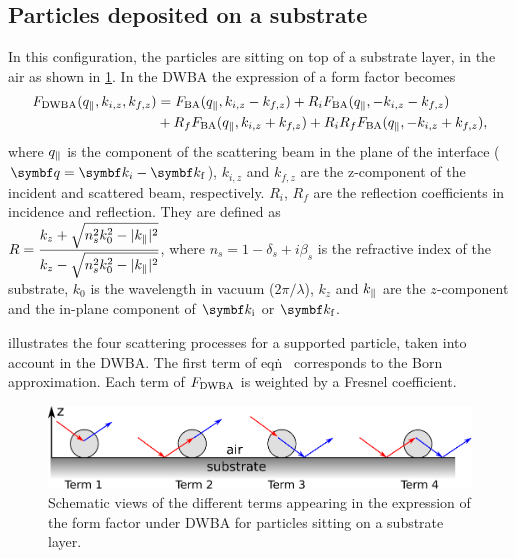 \subsection{Particles deposited on a substrate}
In this configuration, the particles are sitting on top of a substrate layer, in the air as shown in \cref{fig:SchemDWBA}. In the DWBA the expression of a form factor becomes
\begin{align}
F_{\rm{DWBA}}(q_{\parallel}, k_{i,z}, k_{f,z}) &= F_{\rm{BA}}(q_{\parallel}, k_{i,z}-k_{f,z})+ R_i F_{\rm{BA}}(q_{\parallel}, -k_{i,z}-k_{f,z}) \nonumber \\
&+ R_f F_{\rm{BA}}(q_{\parallel}, k_{i,z}+k_{f,z}) + R_i R_f F_{\rm{BA}}(q_{\parallel},-k_{i,z}+k_{f,z}), \label{Edwbaair}
\end{align}
where $q_{\parallel}$ is the component of the scattering beam in the plane of the interface ($\q=\k_i-\k_\sf$), $k_{i,z}$ and $k_{f,z}$ are the z-component of the incident and scattered beam, respectively. $R_i$, $R_f$ are the reflection coefficients in incidence and reflection. They are defined as\\ $R=\dfrac{k_z+\sqrt{n_s^2k_0^2-|k_{\parallel}|^2}}{k_z-\sqrt{n_s^2 k_0^2-|k_{\parallel}|^2}}$, where $n_s=1-\delta_s +i \beta_s$ is the refractive index of the substrate, $k_0$ is the wavelength in vacuum ($2\pi /\lambda$), $k_z$ and $k_{\parallel}$ are the $z$-component and the in-plane component of $\k_\si$ or $\k_\sf$. \\


\vspace{18pt}

 illustrates the four scattering processes for a supported particle, taken into account in the DWBA. The first term of eqn\.~  corresponds to the Born approximation. Each term of $F_{\rm{DWBA}}$ is weighted by a Fresnel coefficient.

\begin{figure}[tb]
\begin{center}
\includegraphics[width=\textwidth]{fig/drawing/drawingDWBA.pdf}
\end{center}
\caption{Schematic views of the different terms appearing in the expression of the form factor under DWBA for particles sitting on a substrate layer.}
\label{fig:SchemDWBA}
\end{figure}


